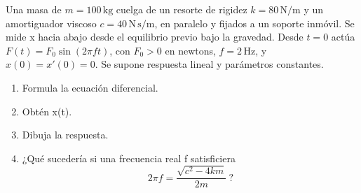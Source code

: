 Una masa de \(m=100\,\mathrm{kg}\) cuelga de un resorte de rigidez \(k=80\,\mathrm{N/m}\) y un amortiguador viscoso \(c=40\,\mathrm{N\,s/m}\), en paralelo y fijados a un soporte inmóvil. Se mide x hacia abajo desde el equilibrio previo bajo la gravedad. Desde \(t=0\) actúa \(F(t)=F_0\sin(2\pi ft)\), con \(F_0>0\) en newtons, \(f=2\,\mathrm{Hz}\), y \(x(0)=x'(0)=0\). Se supone respuesta lineal y parámetros constantes.

\begin{enumerate}[label=(\alph*),ref=\alph*,leftmargin=*]
\item Formula la ecuación diferencial.
\item Obtén x(t).
\item Dibuja la respuesta.
\item ¿Qué sucedería si una frecuencia real f satisficiera
\[2\pi f=\frac{\sqrt{c^2-4km}}{2m}\ ?\]
\end{enumerate}
